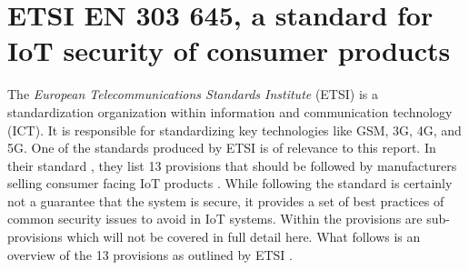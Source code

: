 \section{ETSI EN 303 645, a standard for IoT security of consumer products}
The \textit{European Telecommunications Standards Institute} (ETSI) is a standardization organization within information and communication technology (ICT). It is responsible for standardizing key technologies like GSM, 3G, 4G, and 5G. One of the standards produced by ETSI is of relevance to this report. In their standard , they list 13 provisions that should be followed by manufacturers selling consumer facing IoT products \cite{etsi-iot-standard}. While following the standard is certainly not a guarantee that the system is secure, it provides a set of best practices of common security issues to avoid in IoT systems. Within the provisions are sub-provisions which will not be covered in full detail here. What follows is an overview of the 13 provisions as outlined by ETSI \cite{etsi-iot-standard}.
